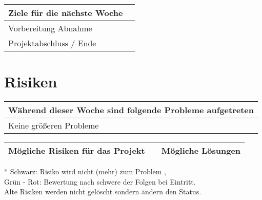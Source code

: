 \vspace{1cm}

\begin{tabularx}{\textwidth}{Xc}
\arrayrulecolor{OliveGreen}
\toprule
{\bf Ziele für die nächste Woche} 									&		\\ 
\midrule[2pt]
Vorbereitung Abnahme									&		\\
\rowcolor{OliveGreen!15}
Projektabschluss / Ende								&		\\

\end{tabularx}

\section*{Risiken}

\begin{tabularx}{\textwidth}{X}
\arrayrulecolor{OliveGreen}
\toprule
{\bf Während dieser Woche sind folgende Probleme aufgetreten} 	\\ 
\midrule[2pt]
Keine größeren Probleme											\\
\bottomrule[2pt]
\end{tabularx}

\vspace{1cm}

\begin{threeparttable}
\begin{tabularx}{\textwidth}{XcX}
\arrayrulecolor{OliveGreen}
\toprule
{\bf Mögliche Risiken für das Projekt}		& {\bf *} 					& {\bf Mögliche Lösungen} 	\\ \midrule[2pt]
\bottomrule[2pt]
\end{tabularx}

\begin{tablenotes}\footnotesize
\item[*] Schwarz: Risiko wird nicht (mehr) zum Problem	, 	\\
		Grün - Rot: Bewertung nach schwere der Folgen bei Eintritt.\\
		Alte Risiken werden nicht gelöscht sondern ändern den Status.
\end{tablenotes}
\end{threeparttable}
